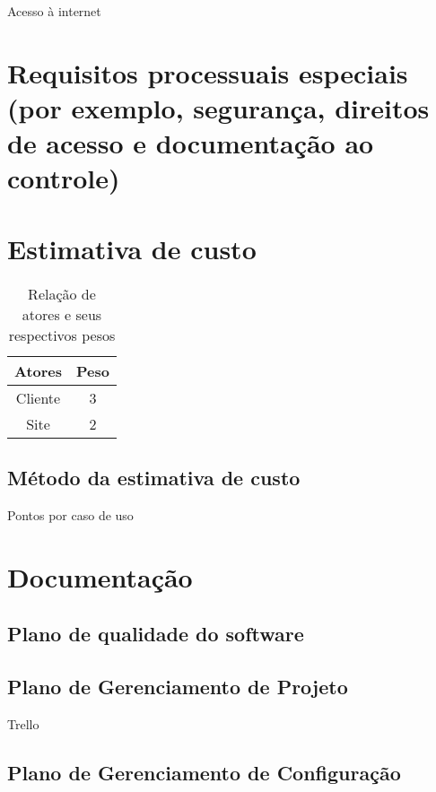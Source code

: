 Acesso à internet

\section{Requisitos processuais especiais (por exemplo, segurança, direitos de acesso e documentação ao controle)}

\section{Estimativa de custo}

\begin{table}[!htb]
	\caption[Atores]{Relação de atores e seus respectivos pesos}
	\label{tab:correlacao}
	\centering
	\begin{tabular}{c|c}
		\hline
		Atores & Peso \\
		\hline
		Cliente & 3 \\
		Site & 2 \\
		\hline
	\end{tabular}
\end{table}





\subsection{Método da estimativa de custo}

Pontos por caso de uso

\section{Documentação}

\subsection{Plano de qualidade do software}

\subsection{Plano de Gerenciamento de Projeto}

Trello

\subsection{Plano de Gerenciamento de Configuração}

